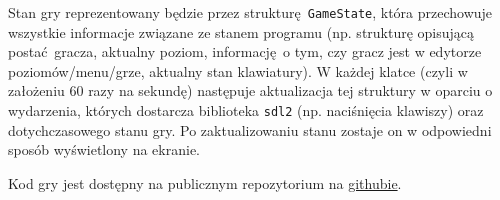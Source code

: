 \documentclass[12pt, a4paper, oneside]{article}
\begin{document}
Stan gry reprezentowany będzie przez strukturę \texttt{GameState}, która 
przechowuje wszystkie informacje związane ze stanem programu (np. strukturę 
opisującą postać gracza, aktualny poziom, informację o tym, czy gracz jest w 
edytorze poziomów/menu/grze, aktualny stan klawiatury). W każdej klatce (czyli 
w założeniu 60 razy na sekundę) następuje aktualizacja tej struktury w oparciu 
o wydarzenia, których dostarcza biblioteka \texttt{sdl2} (np. naciśnięcia 
klawiszy) oraz dotychczasowego stanu gry. Po zaktualizowaniu stanu zostaje on w 
odpowiedni sposób wyświetlony na ekranie.
\newline

Kod gry jest dostępny na publicznym repozytorium na \href{https://github.com/JakubGrobelny/mario-clone}{githubie}.
\end{document}

